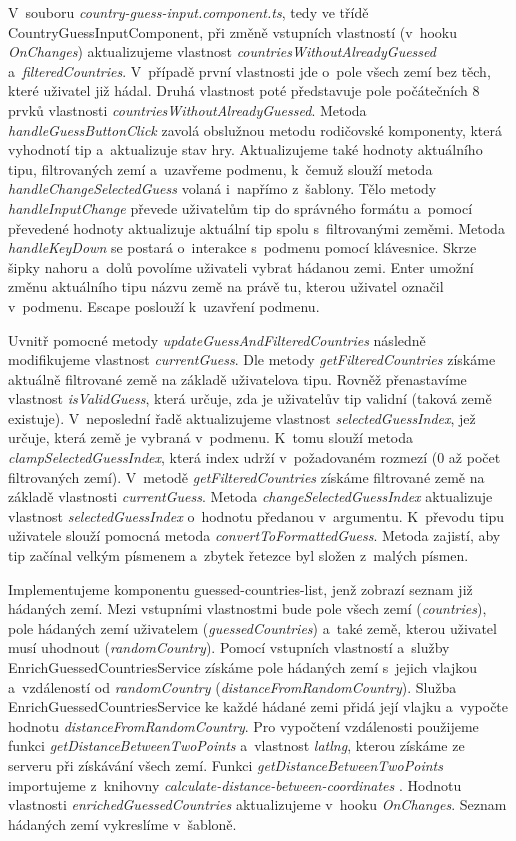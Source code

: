 V~souboru \emph{country-guess-input.component.ts}, tedy ve třídě CountryGuessInputComponent, při změně vstupních vlastností (v~hooku \emph{OnChanges}) aktualizujeme vlastnost \emph{countriesWithoutAlreadyGuessed} a~\emph{filteredCountries}. 
V~případě první vlastnosti jde o~pole všech zemí bez těch, které uživatel již hádal. Druhá vlastnost poté představuje pole počátečních 8 prvků vlastnosti \emph{countriesWithoutAlreadyGuessed}. 
Metoda \emph{handleGuessButtonClick} zavolá obslužnou metodu rodičovské komponenty, která vyhodnotí tip a~aktualizuje stav hry. 
Aktualizujeme také hodnoty aktuálního tipu, filtrovaných zemí a~uzavřeme podmenu, k~čemuž slouží metoda \emph{handleChangeSelectedGuess} volaná i~napřímo z~šablony. 
Tělo metody \emph{handleInputChange} převede uživatelům tip do správného formátu a~pomocí převedené hodnoty aktualizuje aktuální tip spolu s~filtrovanými zeměmi.
Metoda \emph{handleKeyDown} se postará o~interakce s~podmenu pomocí klávesnice. Skrze šipky nahoru a~dolů povolíme uživateli vybrat hádanou zemi. 
Enter umožní změnu aktuálního tipu názvu země na právě tu, kterou uživatel označil v~podmenu. Escape poslouží k~uzavření podmenu.

Uvnitř pomocné metody \emph{updateGuessAndFilteredCountries} následně modifikujeme vlastnost \emph{currentGuess}. 
Dle metody \emph{getFilteredCountries} získáme aktuálně filtrované země na základě uživatelova tipu. 
Rovněž přenastavíme vlastnost \emph{isValidGuess}, která určuje, zda je uživatelův tip validní (taková země existuje). 
V~neposlední řadě aktualizujeme vlastnost \emph{selectedGuessIndex}, jež určuje, která země je vybraná v~podmenu. 
K~tomu slouží metoda \emph{clampSelectedGuessIndex}, která index udrží v~požadovaném rozmezí (0 až počet filtrovaných zemí).
V~metodě \emph{getFilteredCountries} získáme filtrované země na základě vlastnosti \emph{currentGuess}. 
Metoda \emph{changeSelectedGuessIndex} aktualizuje vlastnost \emph{selectedGuessIndex} o~hodnotu předanou v~argumentu. 
K~převodu tipu uživatele slouží pomocná metoda \emph{convertToFormattedGuess}. Metoda zajistí, aby tip začínal velkým písmenem a~zbytek řetezce byl složen z~malých písmen.

Implementujeme komponentu guessed-countries-list, jenž zobrazí seznam již hádaných zemí. 
Mezi vstupními vlastnostmi bude pole všech zemí (\emph{countries}), pole hádaných zemí uživatelem (\emph{guessedCountries}) a~také země, kterou uživatel musí uhodnout (\emph{randomCountry}).
Pomocí vstupních vlastností a~služby EnrichGuessedCountriesService získáme pole hádaných zemí s~jejich vlajkou a~vzdáleností od \emph{randomCountry} (\emph{distanceFromRandomCountry}).
Služba EnrichGuessedCountriesService ke každé hádané zemi přidá její vlajku a~vypočte hodnotu \emph{distanceFromRandomCountry}. 
Pro vypočtení vzdálenosti použijeme funkci \emph{getDistanceBetweenTwoPoints} a~vlastnost \emph{latlng}, kterou získáme ze serveru při získávání všech zemí. 
Funkci \emph{getDistanceBetweenTwoPoints} importujeme z~knihovny \emph{calculate-distance-between-coordinates} \cite{distancebetweencoordinates}. 
Hodnotu vlastnosti \emph{enrichedGuessedCountries} aktualizujeme v~hooku \emph{OnChanges}. Seznam hádaných zemí vykreslíme v~šabloně.

